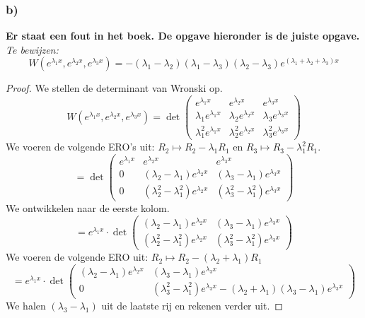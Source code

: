\documentclass[lineaire_algebra_oplossingen.tex]{subfiles}
\begin{document}
\subsubsection*{b)}
\textbf{Er staat een fout in het boek. De opgave hieronder is de juiste opgave.}\\
\textit{Te bewijzen:}
\[
W(e^{\lambda_1x}, e^{\lambda_2x}, e^{\lambda_3x}) = -(\lambda_1-\lambda_2) (\lambda_1-\lambda_3) (\lambda_2-\lambda_3)
e^{(\lambda_1 + \lambda_2 + \lambda_3)x}
\]
\begin{proof}
We stellen de determinant van Wronski op.
\[
W(e^{\lambda_1x}, e^{\lambda_2x}, e^{\lambda_3x})
= \det
\begin{pmatrix}
e^{\lambda_1x}             & e^{\lambda_2x}             & e^{\lambda_3x} \\
\lambda_1 e^{\lambda_1x}   & \lambda_2 e^{\lambda_2x}   & \lambda_3 e^{\lambda_3x} \\
\lambda_1^2 e^{\lambda_1x} & \lambda_2^2 e^{\lambda_2x} & \lambda_3^2 e^{\lambda_3x}
\end{pmatrix}
\]
We voeren de volgende ERO's uit: $R_2 \longmapsto R_2 - \lambda_1R_1$ en $R_3 \longmapsto R_3 - \lambda_1^2R_1$.
\[
= \det
\begin{pmatrix}
e^{\lambda_1x} & e^{\lambda_2x}                           & e^{\lambda_3x} \\
0              & (\lambda_2-\lambda_1) e^{\lambda_2x}     & (\lambda_3-\lambda_1) e^{\lambda_3x} \\
0              & (\lambda_2^2-\lambda_1^2) e^{\lambda_2x} & (\lambda_3^2-\lambda_1^2) e^{\lambda_3x}
\end{pmatrix}
\]
We ontwikkelen naar de eerste kolom.
\[
= e^{\lambda_1x} \cdot \det
\begin{pmatrix}
(\lambda_2-\lambda_1) e^{\lambda_2x}     & (\lambda_3-\lambda_1) e^{\lambda_3x} \\
(\lambda_2^2-\lambda_1^2) e^{\lambda_2x} & (\lambda_3^2-\lambda_1^2) e^{\lambda_3x}
\end{pmatrix}
\]
We voeren de volgende ERO uit: $R_2 \longmapsto R_2 - (\lambda_2+\lambda_1)R_1$
\[
= e^{\lambda_1x} \cdot \det
\begin{pmatrix}
(\lambda_2-\lambda_1) e^{\lambda_2x} & (\lambda_3-\lambda_1) e^{\lambda_3x} \\
0                                    & (\lambda_3^2-\lambda_1^2) e^{\lambda_3x} - (\lambda_2+\lambda_1) (\lambda_3-\lambda_1) e^{\lambda_3x}
\end{pmatrix}
\]
We halen $(\lambda_3-\lambda_1)$ uit de laatste rij en rekenen verder uit.

\end{proof}
\end{document}
